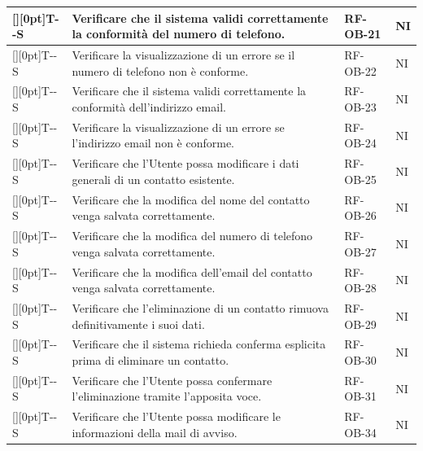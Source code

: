 \documentclass[a4paper,12pt]{article}
\newcounter{testsys}
\newcommand{\systestcode}{%
  \raisebox{0pt}[\height][0pt]{\hypertarget{T-\arabic{testsys}-S}{}}T-\arabic{testsys}-S%
}
\begin{document}
\begin{longtable}{| >{\centering\arraybackslash}p{} | >{\raggedright\arraybackslash}p{} | >{\centering\arraybackslash}p{} | >{\centering\arraybackslash}p{} |}
\stepcounter{testsys} \systestcode & Verificare che il sistema validi correttamente la conformità del numero di telefono. & RF-OB-21 & NI \\
\hline

\stepcounter{testsys} \systestcode & Verificare la visualizzazione di un errore se il numero di telefono non è conforme. & RF-OB-22 & NI \\
\hline

\stepcounter{testsys} \systestcode & Verificare che il sistema validi correttamente la conformità dell'indirizzo email. & RF-OB-23 & NI \\
\hline

\stepcounter{testsys} \systestcode & Verificare la visualizzazione di un errore se l'indirizzo email non è conforme. & RF-OB-24 & NI \\
\hline

\stepcounter{testsys} \systestcode & Verificare che l'Utente possa modificare i dati generali di un contatto esistente. & RF-OB-25 & NI \\
\hline

\stepcounter{testsys} \systestcode & Verificare che la modifica del nome del contatto venga salvata correttamente. & RF-OB-26 & NI \\
\hline

\stepcounter{testsys} \systestcode & Verificare che la modifica del numero di telefono venga salvata correttamente. & RF-OB-27 & NI \\
\hline

\stepcounter{testsys} \systestcode & Verificare che la modifica dell'email del contatto venga salvata correttamente. & RF-OB-28 & NI \\
\hline

\stepcounter{testsys} \systestcode & Verificare che l'eliminazione di un contatto rimuova definitivamente i suoi dati. & RF-OB-29 & NI \\
\hline

\stepcounter{testsys} \systestcode & Verificare che il sistema richieda conferma esplicita prima di eliminare un contatto. & RF-OB-30 & NI \\
\hline

\stepcounter{testsys} \systestcode & Verificare che l'Utente possa confermare l'eliminazione tramite l'apposita voce. & RF-OB-31 & NI \\
\hline

\stepcounter{testsys} \systestcode & Verificare che l'Utente possa modificare le informazioni della mail di avviso. & RF-OB-34 & NI \\
\hline


\end{longtable}
\end{document}
